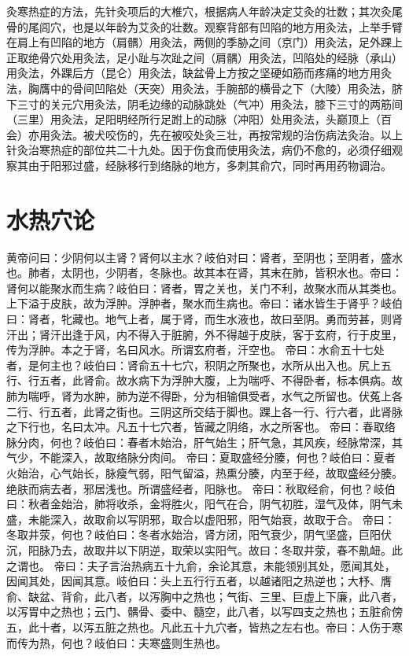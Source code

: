 \documentclass[a4paper,12pt,UTF8,twoside]{ctexbook}
\begin{document}
灸寒热症的方法，先针灸项后的大椎穴，根据病人年龄决定艾灸的壮数；其次灸尾骨的尾闾穴，也是以年龄为艾灸的壮数。观察背部有凹陷的地方用灸法，上举手臂在肩上有凹陷的地方（肩髃）用灸法，两侧的季胁之间（京门）用灸法，足外踝上正取绝骨穴处用灸法，足小趾与次趾之间（肩髃）用灸法，凹陷处的经脉（承山）用灸法，外踝后方（昆仑）用灸法，缺盆骨上方按之坚硬如筋而疼痛的地方用灸法，胸膺中的骨间凹陷处（天突）用灸法，手腕部的横骨之下（大陵）用灸法，脐下三寸的关元穴用灸法，阴毛边缘的动脉跳处（气冲）用灸法，膝下三寸的两筋间（三里）用灸法，足阳明经所行足跗上的动脉（冲阳）处用灸法，头巅顶上（百会）亦用灸法。被犬咬伤的，先在被咬处灸三壮，再按常规的治伤病法灸治。以上针灸治寒热症的部位共二十九处。因于伤食而使用灸法，病仍不愈的，必须仔细观察其由于阳邪过盛，经脉移行到络脉的地方，多刺其俞穴，同时再用药物调治。
\chapter{水热穴论}
黄帝问曰：少阴何以主肾？肾何以主水？岐伯对曰：肾者，至阴也；至阴者，盛水也。肺者，太阴也，少阴者，冬脉也。故其本在肾，其末在肺，皆积水也。帝曰：肾何以能聚水而生病？岐伯曰：肾者，胃之关也，关门不利，故聚水而从其类也。上下溢于皮肤，故为浮肿。浮肿者，聚水而生病也。帝曰：诸水皆生于肾乎？岐伯曰：肾者，牝藏也。地气上者，属于肾，而生水液也，故曰至阴。勇而劳甚，则肾汗出；肾汗出逢于风，内不得入于脏腑，外不得越于皮肤，客于玄府，行于皮里，传为浮肿。本之于肾，名曰风水。所谓玄府者，汗空也。
帝曰：水俞五十七处者，是何主也？岐伯曰：肾俞五十七穴，积阴之所聚也，水所从出入也。尻上五行、行五者，此肾俞。故水病下为浮肿大腹，上为喘呼、不得卧者，标本俱病。故肺为喘呼，肾为水肿，肺为逆不得卧，分为相输俱受者，水气之所留也。伏菟上各二行、行五者，此肾之街也。三阴这所交结于脚也。踝上各一行、行六者，此肾脉之下行也，名曰太冲。凡五十七穴者，皆藏之阴络，水之所客也。
帝曰：春取络脉分肉，何也？岐伯曰：春者木始治，肝气始生；肝气急，其风疾，经脉常深，其气少，不能深入，故取络脉分肉间。
帝曰：夏取盛经分腠，何也？岐伯曰：夏者火始治，心气始长，脉瘦气弱，阳气留溢，热熏分腠，内至于经，故取盛经分腠。绝肤而病去者，邪居浅也。所谓盛经者，阳脉也。
帝曰：秋取经俞，何也？岐伯曰：秋者金始治，肺将收杀，金将胜火，阳气在合，阴气初胜，湿气及体，阴气未盛，未能深入，故取俞以写阴邪，取合以虚阳邪，阳气始衰，故取于合。
帝曰：冬取井荥，何也？岐伯曰：冬者水始治，肾方闭，阳气衰少，阴气坚盛，巨阳伏沉，阳脉乃去，故取井以下阴逆，取荣以实阳气。故曰：冬取井荥，春不鼽衄。此之谓也。
帝曰：夫子言治热病五十九俞，余论其意，未能领别其处，愿闻其处，因闻其处，因闻其意。岐伯曰：头上五行行五者，以越诸阳之热逆也；大杼、膺俞、缺盆、背俞，此八者，以泻胸中之热也；气街、三里、巨虚上下廉，此八者，以泻胃中之热也；云门、髃骨、委中、髓空，此八者，以写四支之热也；五脏俞傍五，此十者，以泻五脏之热也。凡此五十九穴者，皆热之左右也。帝曰：人伤于寒而传为热，何也？岐伯曰：夫寒盛则生热也。
\end{document}
